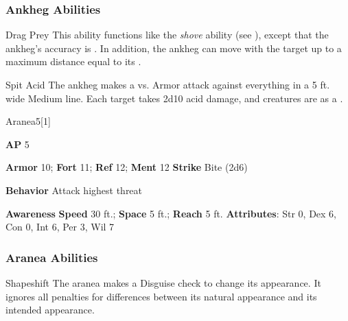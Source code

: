 \subsubsection{Ankheg Abilities}

\begin{ability}{Drag Prey}
This ability functions like the \textit{shove} ability (see ), except that the ankheg's accuracy is .
In addition, the ankheg can move with the target up to a maximum distance equal to its .
\end{ability}

\vspace{0.5em}
\begin{ability}{Spit Acid}
The ankheg makes a  vs. Armor attack against everything in a 5 ft. wide Medium line.
\hit Each target takes 2d10 acid damage, and creatures are  as a .
\end{ability}

\begin{monsection}{Aranea}{5}[1]
\vspace{-1em}\vspace{-1em}
\begin{spellcontent}
\begin{spelltargetinginfo}
{\textbf{AP} 5}

\pari \textbf{Armor} 10;
\textbf{Fort} 11;
\textbf{Ref} 12;
\textbf{Ment} 12
\pari \textbf{Strike} Bite  (2d6)



\pari \textbf{Behavior} Attack highest threat
\end{spelltargetinginfo}
\end{spellcontent}

\begin{monsterfooter}
\pari \textbf{Awareness} 
\pari \textbf{Speed} 30 ft.;
\textbf{Space} 5 ft.;
\textbf{Reach} 5 ft.
\pari \textbf{Attributes}:
Str 0,
Dex 6,
Con 0,
Int 6,
Per 3,
Wil 7
\end{monsterfooter}
\end{monsection}


\subsubsection{Aranea Abilities}

\begin{ability}{Shapeshift}
The aranea makes a Disguise check to change its appearance.
It ignores all penalties for differences between its natural appearance and its intended appearance.
\end{ability}

